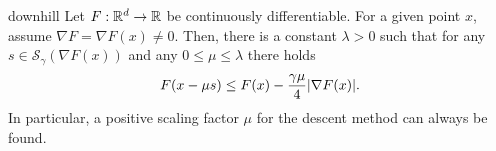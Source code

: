 \begin{Lemma}{downhill}
  Let $F: \mathbb R^d \to \mathbb R$ be continuously differentiable. For a given
  point $x$, assume $\nabla F = \nabla F(x) \neq 0$.  Then, there is a
  constant $\lambda > 0$ such that for any
  $s\in \mathcal S_\gamma(\nabla F(x))$ and any
  $0 \le \mu \le \lambda$ there holds
  \begin{gather}
    \label{eq:downhill:1}
    F(x-\mu s) \le F(x) - \frac{\gamma\mu}4 \lvert\nabla F(x)\rvert.
  \end{gather}
  In particular, a positive scaling factor $\mu$ for the descent method can
  always be found.
\end{Lemma}
